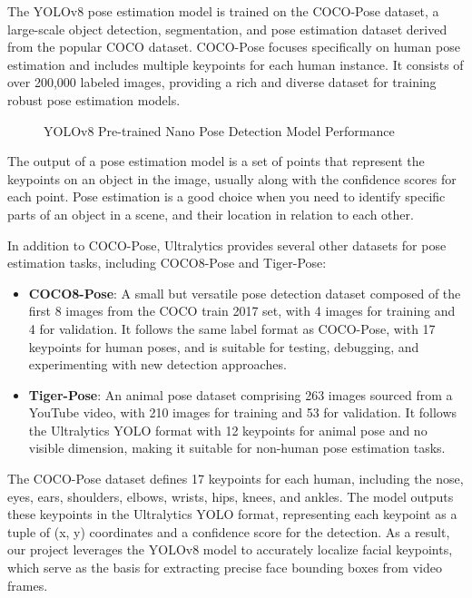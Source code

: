 The YOLOv8 pose estimation model is trained on the COCO-Pose dataset, a large-scale object detection, segmentation, and pose estimation dataset derived from the popular COCO dataset. COCO-Pose focuses specifically on human pose estimation and includes multiple keypoints for each human instance. It consists of over 200,000 labeled images, providing a rich and diverse dataset for training robust pose estimation models.

\begin{figure}[H]
    \centering
    \caption{YOLOv8 Pre-trained Nano Pose Detection Model Performance}
    \label{fig:enter-label}
\end{figure}

The output of a pose estimation model is a set of points that represent the keypoints on an object in the image, usually along with the confidence scores for each point. Pose estimation is a good choice when you need to identify specific parts of an object in a scene, and their location in relation to each other.

In addition to COCO-Pose, Ultralytics provides several other datasets for pose estimation tasks, including COCO8-Pose and Tiger-Pose:

\begin{itemize}
    \item \textbf{COCO8-Pose}: A small but versatile pose detection dataset composed of the first 8 images from the COCO train 2017 set, with 4 images for training and 4 for validation. It follows the same label format as COCO-Pose, with 17 keypoints for human poses, and is suitable for testing, debugging, and experimenting with new detection approaches.
    \item \textbf{Tiger-Pose}: An animal pose dataset comprising 263 images sourced from a YouTube video, with 210 images for training and 53 for validation. It follows the Ultralytics YOLO format with 12 keypoints for animal pose and no visible dimension, making it suitable for non-human pose estimation tasks.
\end{itemize}

The COCO-Pose dataset defines 17 keypoints for each human, including the nose, eyes, ears, shoulders, elbows, wrists, hips, knees, and ankles. The model outputs these keypoints in the Ultralytics YOLO format, representing each keypoint as a tuple of (x, y) coordinates and a confidence score for the detection. As a result, our project leverages the YOLOv8 model to accurately localize facial keypoints, which serve as the basis for extracting precise face bounding boxes from video frames.

